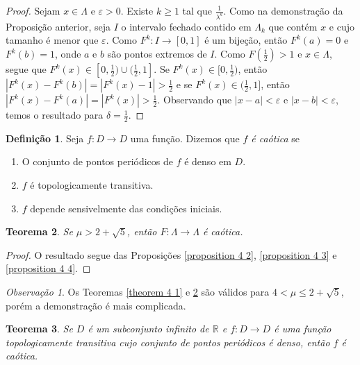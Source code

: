 \documentclass[a4paper, 12pt]{article}
\theoremstyle{definition}
\newtheorem{definition}{Definição}[section]
\theoremstyle{plain}
\theoremstyle{plain}
\theoremstyle{plain}
\newtheorem{theorem}[definition]{Teorema}
\theoremstyle{remark}
\newtheorem*{remark}{Observação}
\newcommand{\RR}{\mathbb{R}}
\begin{document}
\begin{proof}
Sejam $x \in \Lambda$ e $\varepsilon > 0$. Existe $k \geq 1$ tal que $\frac{1}{\lambda^k}$. Como na demonstração da Proposição anterior, seja $I$ o intervalo fechado contido em $\Lambda_k$ que contém $x$ e cujo tamanho é menor que $\varepsilon$. Como $F^k: I \rightarrow [0, 1]$ é um bijeção, então $F^k(a) = 0$ e  $F^k(b) = 1$, onde $a$ e $b$ são pontos extremos de $I$. Como $F(\frac{1}{2}) > 1$ e $x \in \Lambda$, segue que $F^{k}(x) \in [0, \frac{1}{2}) \cup (\frac{1}{2}, 1]$. Se $F^{k}(x) \in [0, \frac{1}{2})$, então $|F^k(x) - F^k(b)| = |F^k(x) - 1| > \frac{1}{2}$ e se $F^{k}(x) \in (\frac{1}{2}, 1]$, então $|F^k(x) - F^k(a)| = |F^k(x)| > \frac{1}{2}$. Observando que $|x - a| < \varepsilon$ e  $|x - b| < \varepsilon$, temos o resultado para $\delta = \frac{1}{2}$. 
\end{proof}

\begin{definition}
Seja $f: D \rightarrow D$ uma função. Dizemos que \textit{$f$ é caótica} se
\begin{enumerate}
\item O conjunto de pontos periódicos de $f$ é denso em $D$.
\item $f$ é topologicamente transitiva.
\item $f$ depende sensivelmente das condições iniciais.
\end{enumerate}
\end{definition}

\begin{theorem}
\label{theorem 4 2}
Se $\mu > 2 + \sqrt{5}$, então $F: \Lambda \rightarrow \Lambda$ é caótica.
\end{theorem}

\begin{proof}
O resultado segue das Proposições \ref{proposition 4 2}, \ref{proposition 4 3} e \ref{proposition 4 4}.
\end{proof}

\begin{remark}
Os Teoremas \ref{theorem 4 1} e \ref{theorem 4 2} são válidos para $4 < \mu \leq 2 + \sqrt{5}$, porém a demonstração é mais complicada.
\end{remark}

\begin{theorem}
\label{theorem 4 3}
Se $D$ é um subconjunto infinito de $\RR$ e $f: D \rightarrow D$ é uma função topologicamente transitiva cujo conjunto de pontos periódicos é denso, então $f$ é caótica.
\end{theorem}
\end{document}
